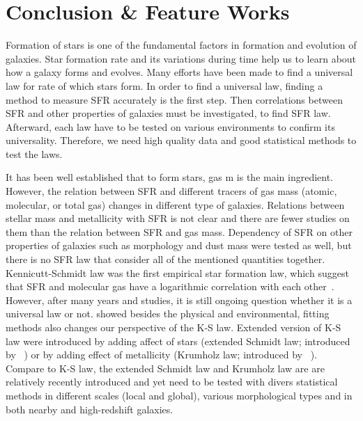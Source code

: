 \chapter{Conclusion \& Feature Works}
\label{ch: summary}
Formation of stars is one of the fundamental factors in formation and evolution of galaxies.
Star formation rate and its variations during time help us to learn about how a galaxy forms and evolves.
Many efforts have been made to find a universal law for rate of which stars form. %
In order to find a universal law, finding a method to measure SFR accurately is the first step.
Then correlations between SFR and other properties of galaxies must be investigated, to find SFR law.
Afterward, each law have to be tested on various environments to confirm its universality.
Therefore, we need high quality data and good statistical methods to test the laws.

It has been well established that to form stars, gas m is the main ingredient.
However, the relation between SFR and different tracers of gas mass (atomic, molecular, or total gas) changes in different type of galaxies.
Relations between stellar mass and metallicity with SFR is not clear and there are fewer studies on them than the relation between SFR and gas mass.
Dependency of SFR on other properties of galaxies such as morphology and dust mass were tested as well, but there is no SFR law that consider all of the mentioned quantities together.
Kennicutt-Schmidt law was the first empirical star formation law, which suggest that SFR and molecular gas have a logarithmic correlation with each other~\citep{Schmidt59, Kennicutt98b}. %
However, after many years and studies, it is still ongoing question whether it is a universal law or not.
\citet{Shetty13} showed besides the physical and environmental, fitting methods also changes our perspective of the K-S law.
Extended version of K-S law were introduced by adding  affect of stars (extended Schmidt law; introduced by ~\citealt{Shi11}) or by adding effect of metallicity (Krumholz law; introduced by ~\citealt{Krumholz09}).
Compare to K-S law, the extended Schmidt law and Krumholz law are are relatively recently introduced and yet need to be tested with divers statistical methods in different scales (local and global), various morphological types and in both nearby and high-redshift galaxies.

